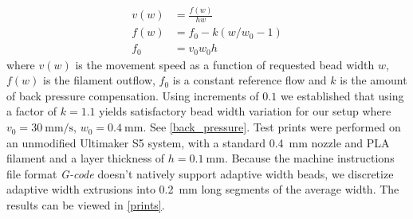 {\begin{align}
 v(w) &= \frac{f(w)}{h w} \\ 
 f(w) &= f_0 - k \left( w / w_0 - 1 \right) \\
 f_0 &= v_0 w_0 h 
\end{align}
where
$v(w)$ is the movement speed as a function of requested bead width $w$,
$f(w)$ is the filament outflow,
$f_0$ is a constant reference flow
and
$k$ is the amount of back pressure compensation.
Using increments of $0.1$ we established that using a factor of $k=1.1$ yields satisfactory bead width variation for our setup where
$v_0=\SI{30}{\milli\meter\per\second}$, 
$w_0=\SI{0.4}{\milli\meter}$.
See \cref{back_pressure}.
%
Test prints were performed on an unmodified Ultimaker S5 system,
with a standard  \SI{0.4}{\milli\meter} nozzle
and PLA filament
and a layer thickness of $h=\SI{0.1}{\milli\meter}$.
Because the machine instructions file format \emph{G-code} doesn't natively support adaptive width beads,
we discretize adaptive width extrusions into \SI{0.2}{\milli\meter} long segments of the average width.
The results can be viewed in \cref{prints}.


}
